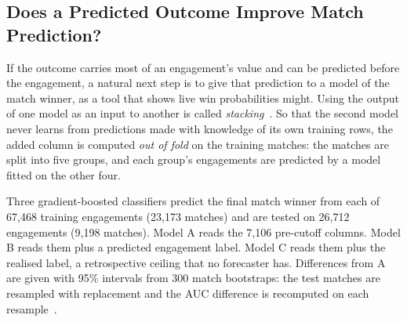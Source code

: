 \subsection{Does a Predicted Outcome Improve Match Prediction?}\label{sec:limit-stacking}

If the outcome carries most of an engagement's value and can be predicted before the engagement, a
natural next step is to give that prediction to a model of the match winner, as a tool that shows live
win probabilities might. Using the output of one model as an input to another is called
\emph{stacking}~\cite{wolpert1992stacked}. So that the second model never learns from predictions made
with knowledge of its own training rows, the added column is computed \emph{out of fold} on the
training matches: the matches are split into five groups, and each group's engagements are predicted by
a model fitted on the other four.

Three gradient-boosted classifiers predict the final match winner from each of 67,468 training
engagements (23,173 matches) and are tested on 26,712 engagements (9,198 matches). Model A reads the
7,106 pre-cutoff columns. Model B reads them plus a predicted engagement label. Model C reads them plus
the realised label, a retrospective ceiling that no forecaster has. Differences from A are given with
95\% intervals from 300 match bootstraps: the test matches are resampled with replacement and the AUC
difference is recomputed on each resample~\cite{efron1993bootstrap}.

